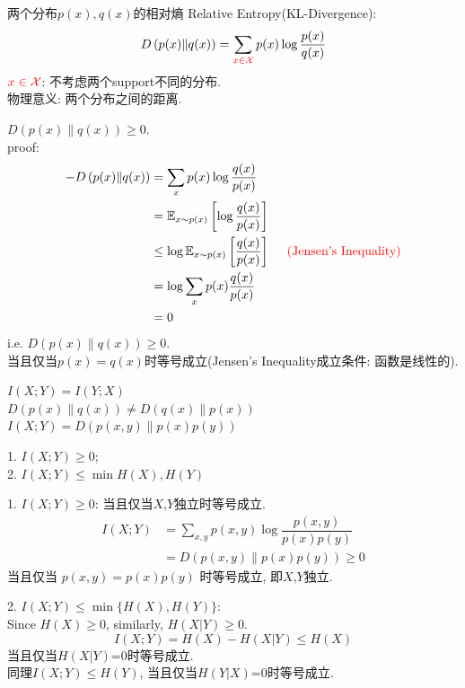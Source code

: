 \begin{definition}
两个分布$p(x),q(x)$的相对熵 Relative Entropy(KL-Divergence):
$$D\left(p(x)\|q(x)\right)=\sum_{\textcolor{red}{x\in\mathcal{X}}}p(x)\log\dfrac{p(x)}{q(x)}$$
$\textcolor{red}{x\in\mathcal{X}}$: 不考虑两个support不同的分布.\\
物理意义: 两个分布之间的距离.
\end{definition}

\begin{proposition}
$D\left(p(x)\|q(x)\right)\geq 0$.\\
proof:
\begin{align*}
-D\left(p(x)\|q(x)\right) &= \sum_{x}p(x)\log\dfrac{q(x)}{p(x)} \\
&= \mathbb{E}_{x\sim p(x)}\left[\log\dfrac{q(x)}{p(x)}\right] \\
&\leq \log\mathbb{E}_{x\sim p(x)}\left[\dfrac{q(x)}{p(x)}\right] \textcolor{red}{\text{\ \ \ \ (Jensen's Inequality)}} \\
&= \log\sum_{x}p(x)\dfrac{q(x)}{p(x)} \\
&= 0
\end{align*}
i.e. $D\left(p(x)\|q(x)\right)\geq 0$.\\
当且仅当$p(x)=q(x)$时等号成立(Jensen's Inequality成立条件: 函数是线性的).
\end{proposition}

\begin{proposition}
$I(X;Y)=I(Y;X)$\\
$D\left(p(x)\|q(x)\right)\neq D\left(q(x)\|p(x)\right)$\\
$I(X;Y)=D\left(p(x,y)\|p(x)p(y)\right)$
\end{proposition}

\begin{proposition}
    1. $I(X;Y)\geq 0$;\\
    2. $I(X;Y)\leq \min{H(X),H(Y)}$
\end{proposition}

1. $I(X;Y)\geq 0$: 当且仅当$X$,$Y$独立时等号成立.
\begin{align*}
I(X;Y) &= \sum_{x,y}p(x,y)\log\dfrac{p(x,y)}{p(x)p(y)} \\
&= D\left(p(x,y)\|p(x)p(y)\right) \geq 0
\end{align*}
当且仅当 $p(x,y)=p(x)p(y)$ 时等号成立, 即$X$,$Y$独立.

2. $I(X;Y)\leq \min\{H(X),H(Y)\}$:\\
Since $H(X)\geq 0$, similarly, $H(X|Y)\geq 0$.
$$I(X;Y) = H(X) - H(X|Y) \leq H(X)$$
当且仅当$H(X|Y)$=0时等号成立.\\
同理$I(X;Y)\leq H(Y)$, 当且仅当$H(Y|X)$=0时等号成立.

